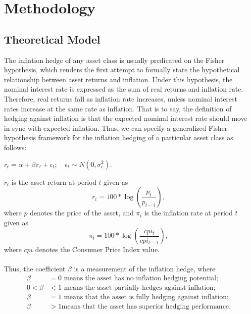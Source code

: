 \documentclass{article}
\begin{document}
\section{Methodology}
\subsection{Theoretical Model}
The inflation hedge of any asset class is usually predicated on the Fisher hypothesis, which renders the first attempt to formally state the hypothetical relationship between asset returns and inflation. Under this hypothesis, the nominal interest rate is expressed as the sum of real returns and inflation rate. Therefore, real returns fall as inflation rate increases, unless nominal interest rates increase at the same rate as inflation. That is to say, the definition of hedging against inflation is that the expected nominal interest rate should move in sync with expected inflation. Thus, we can specify a generalized Fisher hypothesis framework for the inflation hedging of a particular asset class as follows:
\begin{center}
{\(r_t = \alpha + \beta \pi_t + \epsilon_t; \quad \epsilon_t \sim N(0, \sigma^2_{\epsilon})\)}.
\end{center}
\(r_t\) is the asset return at period $t$ given as 
\begin{equation*}
    r_t = 100*\log\left(\frac{p_t}{p_{t-1}}\right),
\end{equation*} 
where $p$ denotes the price of the asset, and $\pi_t$ is the inflation rate at period $t$ given as 
\begin{equation*}
   \pi_t = 100*\log\left(\frac{cpi_t}{cpi_{t-1}}\right),
\end{equation*}
where $cpi$ denotes the Consumer Price Index value. \\~\\
Thus, the coefficient \(\beta\) is a measurement of the inflation hedge, where
\begin{align*}
    \beta &= 0 \text{ means the asset has no inflation hedging potential;}\\
    0 < \beta &< 1 \text{ means the asset partially hedges against inflation;} \\
    \beta &=1 \text{ means that the asset is fully hedging against inflation;} \\
    \beta &>1 \text{means that the asset has superior hedging performance.}
\end{align*}
\end{document}
